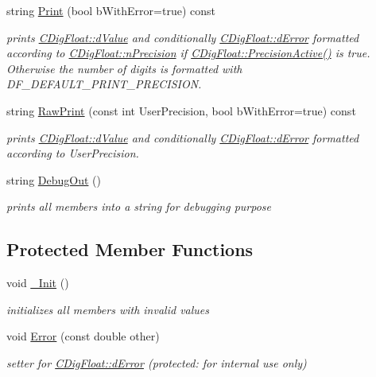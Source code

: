 \begin{DoxyCompactItemize}
string \hyperlink{classCDigFloat_a80731e0970f607114d6d1bde4d02bd39}{Print} (bool b\+With\+Error=true) const
\begin{DoxyCompactList}\small\item\em prints \hyperlink{classCDigFloat_a4bbe69e30dd4e20527362493aa9aaf96}{C\+Dig\+Float\+::d\+Value} and conditionally \hyperlink{classCDigFloat_a25eb3782d1e727ff007a48f8308e3d4d}{C\+Dig\+Float\+::d\+Error} formatted according to \hyperlink{classCDigFloat_ad580654be35246d14c91482581c0bc11}{C\+Dig\+Float\+::n\+Precision} if \hyperlink{classCDigFloat_a4d6ca24beda280be719374c2a6b2c64d}{C\+Dig\+Float\+::\+Precision\+Active()} is true. Otherwise the number of digits is formatted with D\+F\+\_\+\+D\+E\+F\+A\+U\+L\+T\+\_\+\+P\+R\+I\+N\+T\+\_\+\+P\+R\+E\+C\+I\+S\+I\+ON. \end{DoxyCompactList}\item 
string \hyperlink{classCDigFloat_a7051716ffe1294bab6ed6e194a73618e}{Raw\+Print} (const int User\+Precision, bool b\+With\+Error=true) const
\begin{DoxyCompactList}\small\item\em prints \hyperlink{classCDigFloat_a4bbe69e30dd4e20527362493aa9aaf96}{C\+Dig\+Float\+::d\+Value} and conditionally \hyperlink{classCDigFloat_a25eb3782d1e727ff007a48f8308e3d4d}{C\+Dig\+Float\+::d\+Error} formatted according to User\+Precision. \end{DoxyCompactList}\item 
string \hyperlink{classCDigFloat_a006a43f81560e2429dce9aca7742a4e7}{Debug\+Out} ()
\begin{DoxyCompactList}\small\item\em prints all members into a string for debugging purpose \end{DoxyCompactList}\end{DoxyCompactItemize}
\subsection*{Protected Member Functions}
\begin{DoxyCompactItemize}
\item 
void \hyperlink{classCDigFloat_a89a0dda21c74c115ac41b432031666a6}{\+\_\+\+Init} ()
\begin{DoxyCompactList}\small\item\em initializes all members with invalid values \end{DoxyCompactList}\item 
void \hyperlink{classCDigFloat_a5fdd0d560073f5d06b41c7f66933635e}{Error} (const double other)
\begin{DoxyCompactList}\small\item\em setter for \hyperlink{classCDigFloat_a25eb3782d1e727ff007a48f8308e3d4d}{C\+Dig\+Float\+::d\+Error} (protected\+: for internal use only) \end{DoxyCompactList}\end{DoxyCompactItemize}

